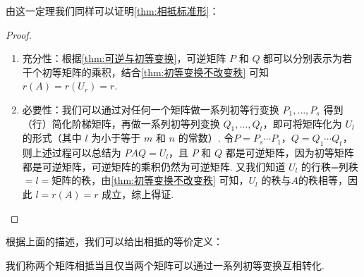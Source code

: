 由这一定理我们同样可以证明\autoref{thm:相抵标准形}：
\begin{proof}
    \begin{enumerate}
        \item 充分性：根据\autoref{thm:可逆与初等变换}，可逆矩阵 $P$ 和 $Q$ 都可以分别表示为若干个初等矩阵的乘积，结合\autoref{thm:初等变换不改变秩} 可知 $r(A) = r(U_r) = r$.
        \item \label{pf:初等变换求相抵标准形PQ} 必要性：我们可以通过对任何一个矩阵做一系列初等行变换 $P_1,\ldots,P_s$ 得到（行）简化阶梯矩阵，再做一系列初等列变换 $Q_1,\ldots,Q_t$，即可将矩阵化为 $U_l$ 的形式（其中 $l$ 为小于等于 $m$ 和 $n$ 的常数）. 令$P = P_s \cdots P_1$，$Q = Q_1 \cdots Q_t$，则上述过程可以总结为 $PAQ = U_l$，且 $P$ 和 $Q$ 都是可逆矩阵，因为初等矩阵都是可逆矩阵，可逆矩阵的乘积仍然为可逆矩阵. 又我们知道 $U_l$ 的行秩=列秩$=l=$矩阵的秩，由\autoref{thm:初等变换不改变秩} 可知，$U_l$ 的秩与$A$的秩相等，因此 $l = r(A) = r$ 成立，综上得证.
    \end{enumerate}
\end{proof}

根据上面的描述，我们可以给出相抵的等价定义：
\begin{definition}{}{}
    我们称两个矩阵相抵当且仅当两个矩阵可以通过一系列初等变换互相转化.
\end{definition}

